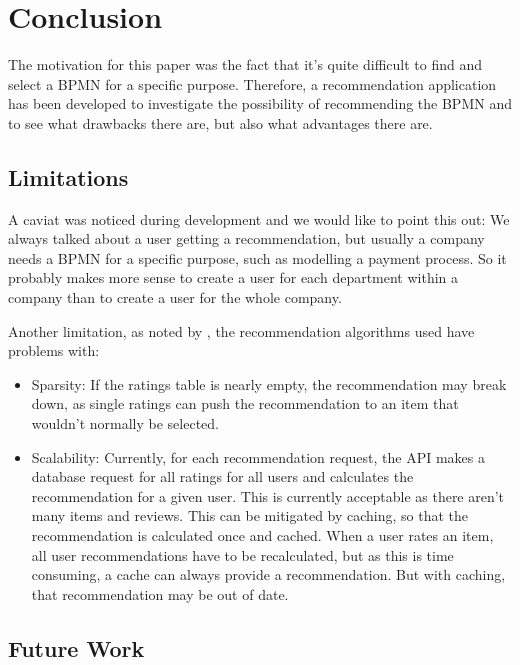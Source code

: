 \chapter{Conclusion}

\label{chap:conclusion}

The motivation for this paper was the fact that it's quite difficult to find and select a BPMN for a specific purpose. Therefore, a recommendation application has been developed to investigate the possibility of recommending the BPMN and to see what drawbacks there are, but also what advantages there are. 

\section{Limitations}

\label{sec:limitations}

A caviat was noticed during development and we would like to point this out: We always talked about a user getting a recommendation, but usually a company needs a BPMN for a specific purpose, such as modelling a payment process. So it probably makes more sense to create a user for each department within a company than to create a user for the whole company.

Another limitation, as noted by \cite{itemColFiltRecom}, the recommendation algorithms used have problems with:

\begin{itemize}
    \item Sparsity: If the ratings table is nearly empty, the recommendation may break down, as single ratings can push the recommendation to an item that wouldn't normally be selected.
    \item Scalability: Currently, for each recommendation request, the API makes a database request for all ratings for all users and calculates the recommendation for a given user. This is currently acceptable as there aren't many items and reviews. This can be mitigated by caching, so that the recommendation is calculated once and cached. When a user rates an item, all user recommendations have to be recalculated, but as this is time consuming, a cache can always provide a recommendation. But with caching, that recommendation may be out of date.
\end{itemize}

\section{Future Work}

